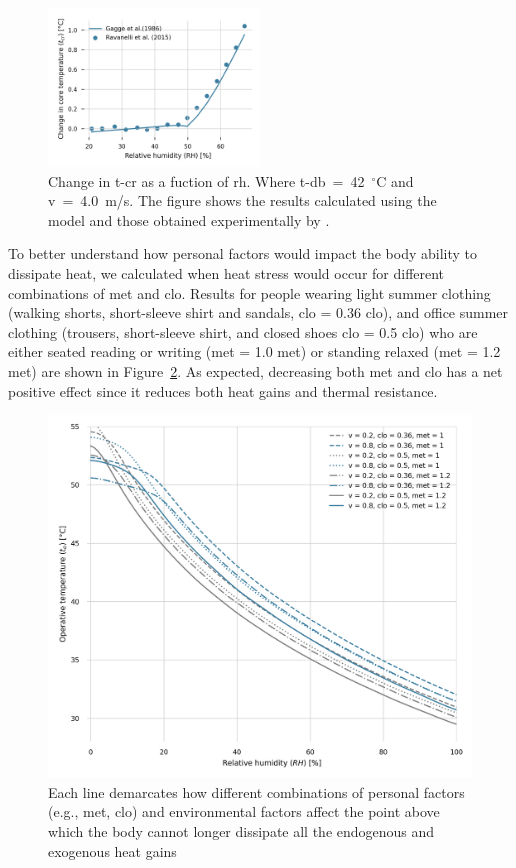 \begin{figure}[thb!]
    \centering
    \includegraphics[width=0.5\textwidth]{figures/comparison_ravanelli}
    \caption{Change in \acf{t-cr} as a fuction of \acf{rh}.
    Where \ac{t-db}~=~42~$^{\circ}$C and \ac{v}~=~4.0~m/s.
    The figure shows the results calculated using the  model and those obtained experimentally by .}
    \label{fig:comparison_ravanelli}
\end{figure}

To better understand how personal factors would impact the body ability to dissipate heat, we calculated when heat stress would occur for different combinations of \ac{met} and \ac{clo}.
Results for people wearing light summer clothing (walking shorts, short-sleeve shirt and sandals, \acs{clo} = 0.36 clo), and office summer clothing (trousers, short-sleeve shirt, and closed shoes \acs{clo} = 0.5 clo) who are either seated reading or writing (\ac{met} = 1.0 met) or standing relaxed (\ac{met} = 1.2 met) are shown in Figure~\ref{fig:met_clo}.
As expected, decreasing both \ac{met} and \ac{clo} has a net positive effect since it reduces both heat gains and thermal resistance.

\begin{figure}[thb!]
    \centering
    \includegraphics[width=\textwidth]{figures/met_clo}
    \caption{Each line demarcates how different combinations of personal factors (e.g., \ac{met}, \ac{clo}) and environmental factors affect the point above which the body cannot longer dissipate all the endogenous and exogenous heat gains}
    \label{fig:met_clo}
\end{figure}

